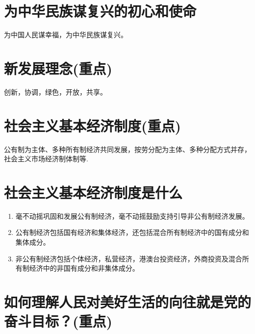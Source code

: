 \documentclass[12pt, a4paper, oneside]{ctexbook}
\begin{document}
\section{为中华民族谋复兴的初心和使命}

为中国人民谋幸福，为中华民族谋复兴。

\section{新发展理念(重点)}

创新，协调，绿色，开放，共享。

\section{社会主义基本经济制度(重点)}

公有制为主体、多种所有制经济共同发展，按劳分配为主体、多种分配方式并存，社会主义市场经济制体制等.

\section{社会主义基本经济制度是什么}

\begin{enumerate}
\item 毫不动摇巩固和发展公有制经济，毫不动摇鼓励支持引导非公有制经济发展。

\item 公有制经济包括国有经济和集体经济，还包括混合所有制经济中的国有成分和集体成分。

\item 非公有制经济包括个体经济，私营经济，港澳台投资经济，外商投资及混合所有制经济中的非国有成分和非集体成分。
\end{enumerate}

\section{如何理解人民对美好生活的向往就是党的奋斗目标？(重点)}
\end{document}
